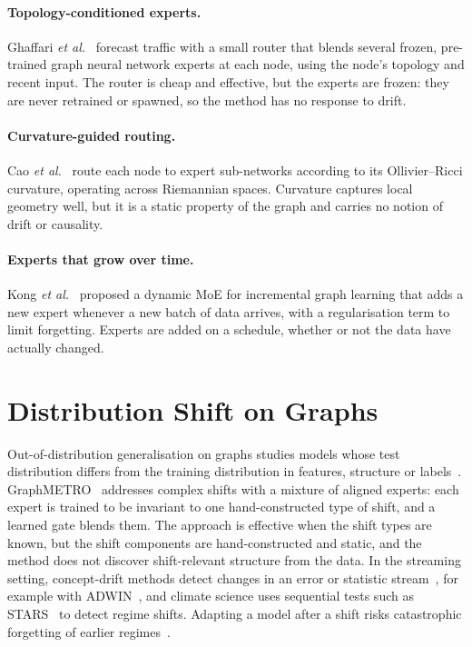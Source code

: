 \paragraph{Topology-conditioned experts.} Ghaffari \emph{et al.}~\cite{ghaffari2026graph} forecast traffic with a small router that blends several frozen, pre-trained graph neural network experts at each node, using the node's topology and recent input. The router is cheap and effective, but the experts are frozen: they are never retrained or spawned, so the method has no response to drift.

\paragraph{Curvature-guided routing.} Cao \emph{et al.}~\cite{cao2026geometric} route each node to expert sub-networks according to its Ollivier--Ricci curvature, operating across Riemannian spaces. Curvature captures local geometry well, but it is a static property of the graph and carries no notion of drift or causality.

\paragraph{Experts that grow over time.} Kong \emph{et al.}~\cite{kong2025dynamic} proposed a dynamic MoE for incremental graph learning that adds a new expert whenever a new batch of data arrives, with a regularisation term to limit forgetting. Experts are added on a schedule, whether or not the data have actually changed.

\section{Distribution Shift on Graphs}
\label{sec:lit-ood}

Out-of-distribution generalisation on graphs studies models whose test distribution differs from the training distribution in features, structure or labels~\cite{li2022ood}. GraphMETRO~\cite{wu2024graphmetro} addresses complex shifts with a mixture of aligned experts: each expert is trained to be invariant to one hand-constructed type of shift, and a learned gate blends them. The approach is effective when the shift types are known, but the shift components are hand-constructed and static, and the method does not discover shift-relevant structure from the data. In the streaming setting, concept-drift methods detect changes in an error or statistic stream~\cite{gama2014survey}, for example with ADWIN~\cite{bifet2007learning}, and climate science uses sequential tests such as STARS~\cite{rodionov2004sequential} to detect regime shifts. Adapting a model after a shift risks catastrophic forgetting of earlier regimes~\cite{kirkpatrick2017overcoming}.

